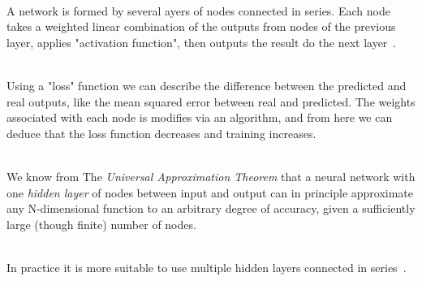 \ \\A network is formed by several ayers of nodes connected in series. Each node takes a weighted linear combination of the outputs from nodes of the previous layer, applies "activation function", then outputs the result do the next layer~\cite{AndrewNg}.

\ \\Using a "loss" function we can describe the difference between the predicted and real outputs, like the mean squared error between real and predicted. The weights associated with each node is modifies via an algorithm, and from here we can deduce that the loss function decreases and training increases.

\ \\We know from The \emph{Universal Approximation Theorem} that a neural network with one \emph{hidden layer} of nodes between input and output can in principle approximate any N-dimensional function to an arbitrary degree of accuracy, given a sufficiently large (though finite) number of nodes. 

\ \\In practice it is more suitable to use multiple hidden layers connected in series~\cite{AndrewNg}.
